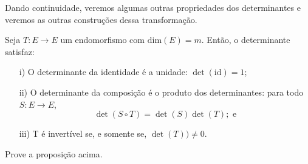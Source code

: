 \documentclass[../differential_forms.tex]{subfiles}
\begin{document}
Dando continuidade, veremos algumas outras propriedades dos determinantes e veremos as outras construções dessa transformação.
\begin{prop*}
	Seja \(T:E\rightarrow E\) um endomorfismo com \(\mathrm{dim}(E)=m\). Então, o determinante satisfaz:
	\begin{itemize}
		\item[i)] O determinante da identidade é a unidade: \(\det{(\mathrm{id})}=1\);
		\item[ii)] O determinante da composição é o produto dos determinantes: para todo \(S:E\rightarrow E\),
		      \[
			      \det{(S\circ T)}=\det{(S)}\det{(T)}; \text{ e}
		      \]
		\item[iii)] T é invertível se, e somente se, \(\det{(T)})\neq 0\).
	\end{itemize}
\end{prop*}
%
%
\begin{exr}
	Prove a proposição acima.
\end{exr}
\end{document}
